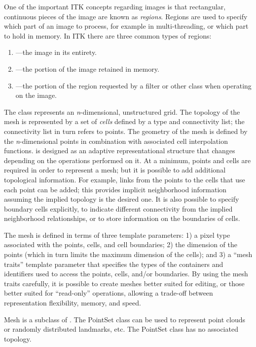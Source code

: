 One of the important ITK concepts regarding images is that rectangular,
continuous pieces of the image are known as \emph{regions}. Regions are used
to specify which part of an image to process, for example in multi-threading,
or which part to hold in memory. In ITK there are three common types of
regions:
\begin{enumerate}
\item {}---the image in its entirety.
\item {}---the portion of the image retained in memory.
\item {}---the portion of the region requested by a
filter or other class when operating on the image.
\end{enumerate}


The  class represents an \emph{n}-dimensional, unstructured grid. The
topology of the mesh is represented by a set of \emph{cells} defined by a type
and connectivity list; the connectivity list in turn refers to points. The
geometry of the mesh is defined by the \emph{n}-dimensional points in
combination with associated cell interpolation functions.  is
designed as an adaptive representational structure that changes depending on
the operations performed on it. At a minimum, points and cells are required in
order to represent a mesh; but it is possible to add additional topological
information.  For example, links from the points to the cells that use each
point can be added; this provides implicit neighborhood information assuming
the implied topology is the desired one. It is also possible to specify
boundary cells explicitly, to indicate different connectivity from the implied
neighborhood relationships, or to store information on the boundaries of
cells.

The mesh is defined in terms of three template parameters: 1) a pixel type
associated with the points, cells, and cell boundaries; 2) the dimension of
the points (which in turn limits the maximum dimension of the cells); and 3)
a ``mesh traits'' template parameter that specifies the types of the
containers and identifiers used to access the points, cells, and/or
boundaries. By using the mesh traits carefully, it is possible to create
meshes better suited for editing, or those better suited for ``read-only''
operations, allowing a trade-off between representation flexibility, memory,
and speed.

Mesh is a subclass of . The PointSet
class can be used to represent point clouds or randomly distributed
landmarks, etc. The PointSet class has no associated topology.


